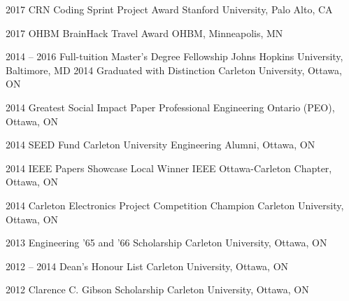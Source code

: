 \documentclass[]{friggeri-cv} %
\begin{document}
\begin{entrylist}
\begin{entrylist}
\entry
{2017}
{CRN Coding Sprint Project Award}
{Stanford University, Palo Alto, CA}
{}
\vspace{-7pt}

\entry
{2017}
{OHBM BrainHack Travel Award}
{OHBM, Minneapolis, MN}
{}
\vspace{-7pt}

\entry
{2014 -- 2016}
{Full-tuition Master's Degree Fellowship}
{Johns Hopkins University, Baltimore, MD}
{}
\vspace{-7pt}
\entry
{2014}
{Graduated with Distinction}
{Carleton University, Ottawa, ON}
{}
\vspace{-7pt}

\entry
{2014}
{Greatest Social Impact Paper}
{Professional Engineering Ontario (PEO), Ottawa, ON}
{}
\vspace{-7pt}

\entry
{2014}
{SEED Fund}
{Carleton University Engineering Alumni, Ottawa, ON}
{}
\vspace{-7pt}

\entry
{2014}
{IEEE Papers Showcase Local Winner}
{IEEE Ottawa-Carleton Chapter, Ottawa, ON}
{}
\vspace{-7pt}

\entry
{2014}
{Carleton Electronics Project Competition Champion}
{Carleton University, Ottawa, ON}
{}
\vspace{-7pt}

\entry
{2013}
{Engineering '65 and '66 Scholarship}
{Carleton University, Ottawa, ON}
{}
\vspace{-7pt}

\entry
{2012 -- 2014}
{Dean's Honour List}
{Carleton University, Ottawa, ON}
{}
\vspace{-7pt}

\entry
{2012}
{Clarence C. Gibson Scholarship}
{Carleton University, Ottawa, ON}
{}
\vspace{-7pt}
\end{entrylist}


\end{entrylist}
\end{document}
